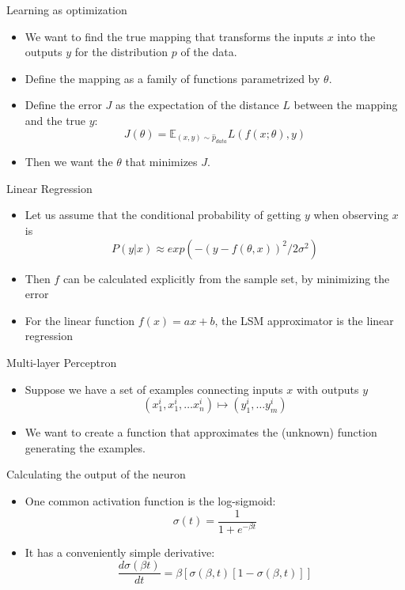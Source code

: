 \documentclass[bigger]{beamer}
\begin{document}
\begin{frame}[fragile]{Learning as optimization}
\begin{itemize}
\item We want to find the true mapping that transforms the inputs $x$
into the outputs $y$ for the distribution $p$ of the data.

\item Define the mapping as a family of functions parametrized by $\theta$.

\item Define the error $J$ as the expectation of the distance $L$ between the mapping and the true $y$:
\[J(\theta) = \mathbb{E}_{(x,y)\sim\hat{p}_{data}} L(f(x;\theta),y)\]

\item Then we want the $\theta$ that minimizes $J$.
\end{itemize}
\end{frame}

\begin{frame}[fragile]{Linear Regression}
\begin{itemize}
\item Let us assume that the conditional probability of getting $y$ when observing $x$ is
\[P(y|x) \approx exp( -(y - f(\theta,x))^2 / 2\sigma^2)\]
\item Then $f$ can be calculated explicitly from the sample set, by minimizing the error
\item For the linear function $f(x) = a x + b$, the LSM approximator is the linear regression
\end{itemize}
\end{frame}

\begin{frame}[fragile]{Multi-layer Perceptron}
\begin{itemize}
\item Suppose we have a set of examples connecting inputs $x$ with outputs $y$
\[(x_1^i, x_1^i,\ldots x_n^i ) \mapsto (y_1^i,\ldots y_m^i)\]
\item We want to create a function that approximates the (unknown) function generating the examples.
\end{itemize}
\end{frame}

\begin{frame}[fragile]{Calculating the output of the neuron}
\begin{itemize}
\item One common activation function is the log-sigmoid:
\[\sigma(t) = \frac{1}{1+e^{-\beta t}}\]
\item It has a conveniently simple derivative:
\[\frac{d\sigma(\beta t)}{dt} = \beta [ \sigma(\beta,t)[1 - \sigma(\beta,t)]]\]
\end{itemize}
\end{frame}
\end{document}
